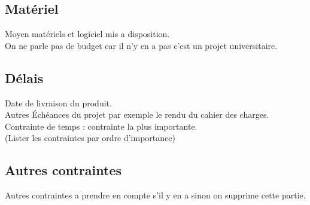 \documentclass{article}
\begin{document}
	\subsection{Matériel}
		Moyen matériels et logiciel mis a disposition.\\
		On ne parle pas de budget car il n'y en a pas c'est un projet universitaire.\\
	\subsection{Délais}
		Date de livraison du produit.\\
		Autres Échéances du projet par exemple le rendu du cahier des charges.
		Contrainte de temps : contrainte la plus importante.\\
		(Lister les contraintes par ordre d'importance)
	\subsection{Autres contraintes}
		Autres contraintes a prendre en compte s'il y en a sinon on supprime cette partie.
\end{document}
